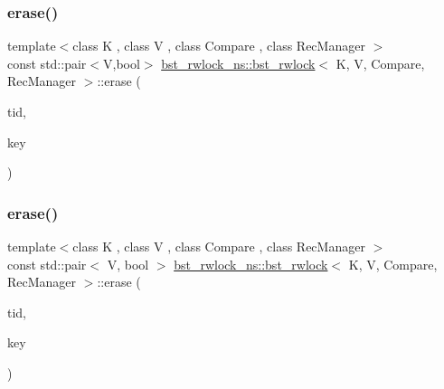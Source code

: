 \mbox{\label{classbst__rwlock__ns_1_1bst__rwlock_a7523642b2b1a2293541a04829258a9e7}} 
\subsubsection{\texorpdfstring{erase()}{erase()}\hspace{0.1cm}{\footnotesize\ttfamily [1/2]}}
{\footnotesize\ttfamily template$<$class K , class V , class Compare , class Rec\+Manager $>$ \\
const std\+::pair$<$V,bool$>$ \hyperlink{classbst__rwlock__ns_1_1bst__rwlock}{bst\+\_\+rwlock\+\_\+ns\+::bst\+\_\+rwlock}$<$ K, V, Compare, Rec\+Manager $>$\+::erase (\begin{DoxyParamCaption}\item[{const int}]{tid,  }\item[{const K \&}]{key }\end{DoxyParamCaption})}

\mbox{\label{classbst__rwlock__ns_1_1bst__rwlock_adbd4f85a6156fb035252641a49d597e8}} 
\subsubsection{\texorpdfstring{erase()}{erase()}\hspace{0.1cm}{\footnotesize\ttfamily [2/2]}}
{\footnotesize\ttfamily template$<$class K , class V , class Compare , class Rec\+Manager $>$ \\
const std\+::pair$<$ V, bool $>$ \hyperlink{classbst__rwlock__ns_1_1bst__rwlock}{bst\+\_\+rwlock\+\_\+ns\+::bst\+\_\+rwlock}$<$ K, V, Compare, Rec\+Manager $>$\+::erase (\begin{DoxyParamCaption}\item[{const int}]{tid,  }\item[{const K \&}]{key }\end{DoxyParamCaption})}

\mbox{\label{classbst__rwlock__ns_1_1bst__rwlock_a6cba52fe5ba2d0cb743d690df5d3eb04}} 
